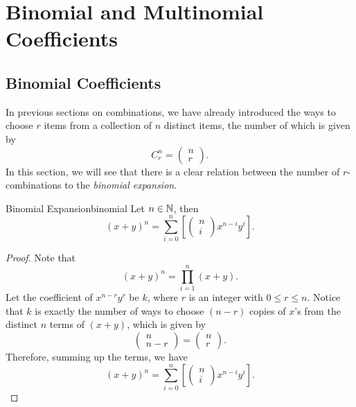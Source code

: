 \documentclass[math]{amznotes}
\theoremstyle{remark}
\begin{document}
\section{Binomial and Multinomial Coefficients}
\subsection{Binomial Coefficients}
In previous sections on combinations, we have already introduced the ways to choose $r$ items from a collection of $n$ distinct items, the number of which is given by
\begin{displaymath}
    C^n_r = \begin{pmatrix}
        n \\
        r
    \end{pmatrix}.
\end{displaymath} 
In this section, we will see that there is a clear relation between the number of $r$-combinations to the \textit{binomial expansion}.
\begin{thmbox}{Binomial Expansion}{binomial}
    Let $n \in \mathbb{N}$, then
    \begin{equation*}
        (x + y)^n = \sum_{i = 0}^{n}\left[\begin{pmatrix}
            n \\
            i
        \end{pmatrix}x^{n - i}y^i\right].
    \end{equation*}
    \tcblower   
    \begin{proof}
        Note that 
        \begin{equation*}
            (x + y)^n = \prod_{i = 1}^{n}(x + y).
        \end{equation*}
        Let the coefficient of $x^{n - r}y^r$ be $k$, where $r$ is an integer with $0 \leq r \leq n$. Notice that $k$ is exactly the number of ways to choose $(n - r)$ copies of $x$'s from the distinct $n$ terms of $(x + y)$, which is given by
        \begin{equation*}
            \begin{pmatrix}
                n \\
                n - r
            \end{pmatrix} = \begin{pmatrix}
                n \\
                r
            \end{pmatrix}.
        \end{equation*}
        Therefore, summing up the terms, we have
        \begin{equation*}
            (x + y)^n = \sum_{i = 0}^{n}\left[\begin{pmatrix}
                n \\
                i
            \end{pmatrix}x^{n - i}y^i\right].
        \end{equation*}
    \end{proof}
\end{thmbox}
\end{document}
